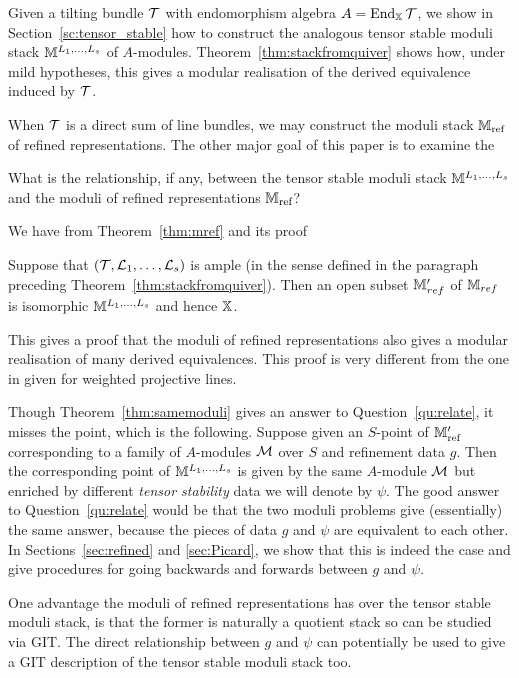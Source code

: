 \documentclass[12pt]{amsart}
\begin{document}
Given a tilting bundle $\mathcal{T}$ with endomorphism algebra $A = \operatorname{End}_{\mathbb{X}} \mathcal{T}$, we show in Section~\ref{sc:tensor_stable} how to construct the analogous tensor stable moduli stack $\mathbb{M}^{L_1,\ldots,L_s}$ of $A$-modules.  Theorem~\ref{thm:stackfromquiver} shows how, under mild hypotheses, this gives a modular realisation of the derived equivalence induced by $\mathcal{T}$. 

When $\mathcal{T}$ is a direct sum of line bundles, we may construct the moduli stack $\mathbb{M}_{\textup{ref}}$ of refined representations. The other major goal of this paper is to examine the
\begin{question} \label{qu:relate}
What is the relationship, if any, between the tensor stable moduli stack $\mathbb{M}^{L_1,\ldots,L_s}$and the moduli of refined representations $\mathbb{M}_{\textup{ref}}$? 
\end{question}
We have from Theorem~\ref{thm:mref} and its proof
\begin{theorem}  \label{thm:samemoduli}
Suppose that $(\mathcal{T},\mathcal{L}_1,\ldots,\mathcal{L}_s)$ is ample (in the sense defined in the paragraph preceding Theorem~\ref{thm:stackfromquiver}). Then an open subset $\mathbb{M}_{ref}'$ of $\mathbb{M}_{ref}$ is isomorphic $\mathbb{M}^{L_1,\ldots,L_s}$ and hence $\mathbb{X}$.
\end{theorem}
This gives a proof that the moduli of refined representations also gives a modular realisation of many derived equivalences. This proof is very different from the one in \cite{AU} given for weighted projective lines. 

Though Theorem~\ref{thm:samemoduli} gives an answer to Question~\ref{qu:relate}, it misses the point, which is the following. Suppose given an $S$-point of $\mathbb{M}_{\textup{ref}}'$ corresponding to a family of $A$-modules $\mathcal{M}$ over $S$ and refinement data $g$. Then the corresponding point of $\mathbb{M}^{L_1,\ldots,L_s}$ is given by the same $A$-module $\mathcal{M}$ but enriched by different {\em tensor stability} data we will denote by $\psi$. The good answer to Question~\ref{qu:relate} would be that the two moduli problems give (essentially) the same answer, because the pieces of data $g$ and $\psi$ are equivalent to each other. In Sections~\ref{sec:refined} and \ref{sec:Picard}, we show that this is indeed the case and give procedures for going backwards and forwards between $g$ and $\psi$.

One advantage the moduli of refined representations has over the tensor stable moduli stack, is that the former is naturally a quotient stack so can be studied via GIT. The direct relationship between $g$ and $\psi$ can potentially be used to give a GIT description of the tensor stable moduli stack too. 
\end{document}
